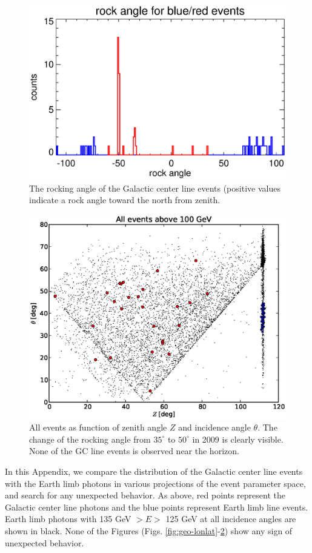 \documentclass[aps,twocolumn,prd,superscriptaddress,showpacs,nofootinbib,fixfloat]{revtex4}
\begin{document}
\begin{figure}
  \centering
  \includegraphics[width=0.9\linewidth]{plots/rockangle.ps}
  \caption{The rocking angle of the Galactic center line
  events (positive values indicate a rock angle toward the
  north from zenith.}
  \label{fig:rock}
\end{figure}

\begin{figure}
  \centering
  \includegraphics[width=0.9\linewidth]{plots/theta_z.eps}
  \caption{All events as function of zenith angle $Z$ and incidence angle
  $\theta$. The change of the rocking angle from $35^\circ$ to $50^\circ$ in
  2009 is clearly visible. None of the GC line events is observed near the
  horizon.}
  \label{fig:theta_z}
\end{figure}

In this Appendix, we compare the distribution of the
Galactic center line events with the Earth limb photons in
various projections of the event parameter space, and 
search for any unexpected
behavior.  As above, red points represent the Galactic
center line photons and the blue points represent
Earth limb line events. Earth limb
photons with 135 GeV $> E >$ 125 GeV at all incidence angles are shown in
black.  None of the Figures (Figs. \ref{fig:geo-lonlat}-\ref{fig:theta_z})
show any sign of unexpected behavior. 

\clearpage

\end{document}
